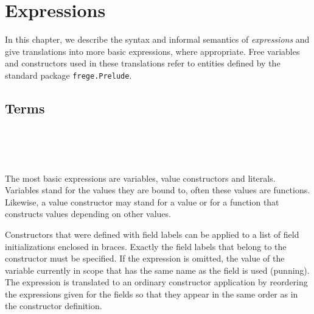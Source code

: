 

\chapter{Expressions} \label{expressions} 

In this chapter, we describe the syntax and informal semantics of \frege{} \emph{expressions} and give translations into more basic expressions, where appropriate.
Free variables and constructors used in these translations refer to entities defined by the standard package \texttt{frege.Prelude}.

\section{Terms} 

\begin{flushleft}
  
  \alt{}   
  \alt{}   \sym{\{}  \sym{\}} 
  \alt{} 
  \alt{} \regex{\_} 
  \alt{} \sym{(}  \sym{)}
  \alt{} \sym{(}  \sym{)}
  \alt{} 
  \alt{} \sym{(} \sym{)} 
  \alt{}  
  \alt{}   \\
 \\
  \\
\end{flushleft}

The most basic expressions are variables, value constructors and literals.
Variables stand for the values they are bound to, often these values are functions.
Likewise, a value constructor may stand for a value or for a function that constructs values depending on other values.

Constructors that were defined with field labels can be applied to a list of field initializations enclosed in braces. 
Exactly the field labels that belong to the constructor must be specified. 
If the expression is omitted, the value of the variable currently in scope that has the same name as the field is used (punning). 
The expression is translated to an ordinary constructor application by reordering the expressions given for the fields so that they appear in the same order as in the constructor definition.


